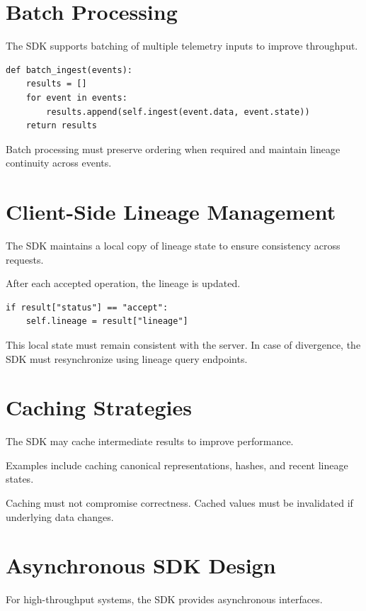 \section{Batch Processing}

The SDK supports batching of multiple telemetry inputs to improve throughput.

\begin{verbatim}
def batch_ingest(events):
    results = []
    for event in events:
        results.append(self.ingest(event.data, event.state))
    return results
\end{verbatim}

Batch processing must preserve ordering when required and maintain lineage continuity across events.

\section{Client-Side Lineage Management}

The SDK maintains a local copy of lineage state to ensure consistency across requests.

After each accepted operation, the lineage is updated.

\begin{verbatim}
if result["status"] == "accept":
    self.lineage = result["lineage"]
\end{verbatim}

This local state must remain consistent with the server. In case of divergence, the SDK must resynchronize using lineage query endpoints.

\section{Caching Strategies}

The SDK may cache intermediate results to improve performance.

Examples include caching canonical representations, hashes, and recent lineage states.

Caching must not compromise correctness. Cached values must be invalidated if underlying data changes.

\section{Asynchronous SDK Design}

For high-throughput systems, the SDK provides asynchronous interfaces.

